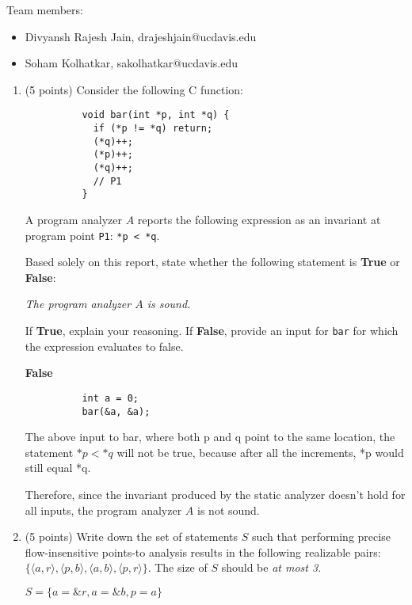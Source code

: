 \documentclass[12pt]{article}
\begin{document}
    \begin{mdframed}
      Team members:
      \begin{itemize}
        \item Divyansh Rajesh Jain, drajeshjain@ucdavis.edu %
        \item Soham Kolhatkar, sakolhatkar@ucdavis.edu %
      \end{itemize}
    \end{mdframed}
    
    \newpage
    \begin{enumerate}
        \item (5 points) Consider the following C function:
        \begin{lstlisting}
          void bar(int *p, int *q) {
            if (*p != *q) return;
            (*q)++;
            (*p)++;
            (*q)++;
            // P1
          }
        \end{lstlisting}
        A program analyzer $A$ reports the following expression as an invariant
        at program point \lstinline$P1$: \lstinline$*p < *q$.

        Based solely on this report, state whether the following statement is
        \textbf{True} or \textbf{False}: 

        \emph{The program analyzer $A$ is sound.}

        If \textbf{True}, explain your reasoning. If \textbf{False}, provide an
        input for \lstinline$bar$ for which the expression evaluates to false.
         \begin{mdframed}
        \textbf{False}
        \begin{lstlisting}
          int a = 0;
          bar(&a, &a);
        \end{lstlisting}

        The above input to bar, where both p and q point to the same location, the statement $*p < *q$ will not be true, because after all the increments, *p would still equal *q.

        Therefore, since the invariant produced by the static analyzer doesn't hold for all inputs, the program analyzer $A$ is not sound.
        \end{mdframed}

        \item (5 points) Write down the set of statements $S$ such that performing precise flow-insensitive points-to
        analysis results in the following realizable pairs:\\
        $\{\langle a, r\rangle,\langle p, b\rangle,  \langle a, b\rangle, \langle p, r\rangle\}$.
        The size of $S$ should be \emph{at most 3}.
        \begin{mdframed}
          $S = \{a = \&r, a = \&b, p = a\}$
          \end{mdframed}



\end{enumerate}
\end{document}
